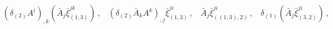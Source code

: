 \begin{equation*}
(\delta_{(2)}A^{i})_{,k}(\bar{A}_{j}\bar{\xi}_{(1,3)}^{jk})\,,\;\;\;(\delta
_{(2)}\bar{A}_{k}A^{k})_{,j}\bar{\xi}_{(1,3)}^{ji}\,,\;\;\;\bar{A}_{j}\bar
{\xi}_{((1,3),2)}^{ji}\,,\;\;\;\delta_{(1)}(\bar{A}_{j}\bar{\xi}%
_{(3,2)}^{ji})\,,
\end{equation*}

